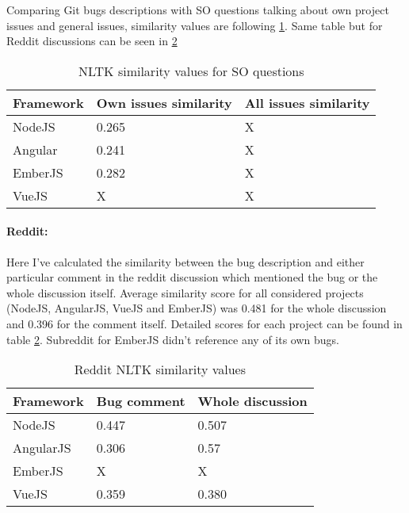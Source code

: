 Comparing Git bugs descriptions with SO questions talking about own project issues and general issues, similarity values are following \ref{table:StackOverflowNLTKsimilarity}. Same table but for Reddit discussions can be seen in \ref{table:RedditNLTKsimilarity}

\begin{table}[H]
\centering
\begin{tabular}{ |p{3cm}||p{5cm}|p{5cm}|}
 \hline
\textbf{ Framework }& \textbf{Own issues similarity}& \textbf{All issues similarity}\\
 \hline
 NodeJS   & 0.265 & X\\ \hline
 Angular & 0.241 & X\\ \hline
 EmberJS & 0.282 & X\\ \hline 
 VueJS &   X & X\\ \hline
\end{tabular}
\caption{NLTK similarity values for SO questions}
\label{table:StackOverflowNLTKsimilarity}
\end{table}

\paragraph{Reddit:}
Here I've calculated the similarity between the bug description and either particular comment in the reddit discussion which mentioned the bug or the whole discussion itself. Average similarity score for all considered projects (NodeJS, AngularJS, VueJS and EmberJS) was 0.481 for the whole discussion and 0.396 for the comment itself. Detailed scores for each project can be found in table \ref{table:RedditNLTKsimilarity}. Subreddit for EmberJS didn't reference any of its own bugs.

\begin{table}[H]
\centering
\begin{tabular}{ |p{3cm}||p{3cm}|p{4cm}|}
 \hline
\textbf{ Framework }& \textbf{Bug comment}& \textbf{Whole discussion}\\
 \hline
 NodeJS   & 0.447 & 0.507\\ \hline 
 AngularJS & 0.306 & 0.57 \\ \hline 
 EmberJS & X & X\\ \hline
 VueJS &   0.359 & 0.380\\ \hline
\end{tabular}
\caption{Reddit NLTK similarity values}
\label{table:RedditNLTKsimilarity}
\end{table}

